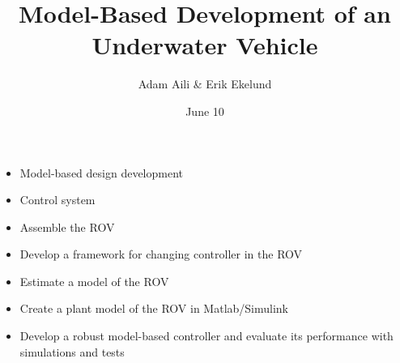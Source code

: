 \documentclass[11pt,aspectratio=169]{beamer}
\author{Adam Aili \& Erik Ekelund}
\title{Model-Based Development of an Underwater Vehicle}
\date{June 10}
\begin{document}
\begin{frame}
\titlepage
\end{frame}
\begin{frame}
\begin{itemize}
\item Model-based design development
\item Control system
\end{itemize}
\end{frame}

\begin{frame}
\begin{itemize}
\item Assemble the ROV
\item Develop a framework for changing controller in the ROV
\item Estimate a model of the ROV
\item Create a plant model of the ROV in Matlab/Simulink
\item Develop a robust model-based controller and evaluate its performance with simulations and tests
\end{itemize}
\end{frame}


\end{document}
